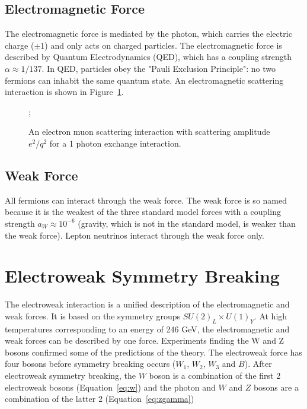 \subsection*{Electromagnetic Force}

The electromagnetic force is mediated by the photon, which carries the electric charge ($\pm 1$) and only acts on charged particles. The electromagnetic force is described by Quantum Electrodynamics (QED), which has a coupling strength $\alpha \approx 1/137$. In QED, particles obey the "Pauli Exclusion Principle": no two fermions can inhabit the same quantum state. An electromagnetic scattering interaction is shown in Figure~\ref{fig:feynman_ee}.

\begin{figure}[h]
	\centering
	;
	\caption{An electron muon scattering interaction with scattering amplitude $e^2/q^2$ for a 1 photon exchange interaction.}
	\label{fig:feynman_ee}
\end{figure}



\subsection*{Weak Force}

All fermions can interact through the weak force. The weak force is so named because it is the weakest of the three standard model forces with a coupling strength $a_W \approx 10^{-6}$ (gravity, which is not in the standard model, is weaker than the weak force). Lepton neutrinos interact through the weak force only.




\section{Electroweak Symmetry Breaking}

The electroweak interaction is a unified description of the electromagnetic and weak forces. It is based on the symmetry groups $SU(2)_L \times U(1)_Y$. At high temperatures corresponding to an energy of 246 GeV, the electromagnetic and weak forces can be described by one force. Experiments finding the W and Z bosons confirmed some of the predictions of the theory. The electroweak force has four bosons before symmetry breaking occurs ($W_1$, $W_2$, $W_3$ and $B$). After electroweak symmetry breaking, the $W$ boson is a combination of the first 2 electroweak bosons (Equation~\ref{eq:w}) and the photon and $W$ and $Z$ bosons are a combination of the latter 2 (Equation~\ref{eq:zgamma})

